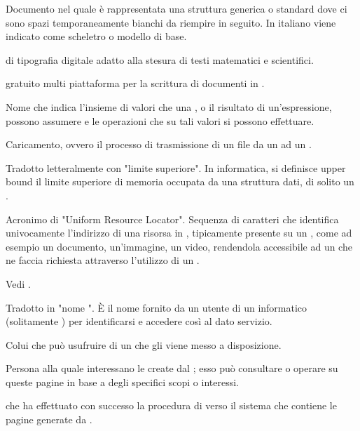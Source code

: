 {


{Documento nel quale è rappresentata una struttura generica o standard dove ci sono spazi temporaneamente bianchi da riempire in seguito. In italiano viene indicato come scheletro o modello di base.}

{ di tipografia digitale adatto alla stesura di testi matematici e scientifici.}

{ gratuito multi piattaforma per la scrittura di documenti in .}

{Nome che indica l'insieme di valori che una , o il risultato di un'espressione, possono assumere e le operazioni che su tali valori si possono effettuare.}




{Caricamento, ovvero il processo di trasmissione di un file da un  ad un .}

{Tradotto letteralmente con "limite superiore". In informatica, si definisce upper bound il limite superiore di memoria occupata da una struttura dati, di solito un .}

{Acronimo di "Uniform Resource Locator". Sequenza di caratteri che identifica univocamente l'indirizzo di una risorsa in , tipicamente presente su un  , come ad esempio un documento, un'immagine, un video, rendendola accessibile ad un  che ne faccia richiesta attraverso l'utilizzo di un  .}

{Vedi .}

{Tradotto in "nome ". \`{E} il nome fornito da un utente di un  informatico (solitamente ) per identificarsi e accedere così al dato servizio.}

{Colui che può usufruire di un  che gli viene messo a disposizione.}

{Persona alla quale interessano le  create dal  ; esso può consultare o operare su queste pagine in base a degli specifici scopi o interessi.}

{ che ha effettuato con successo la procedura di  verso il sistema che contiene le pagine generate da .}

}
